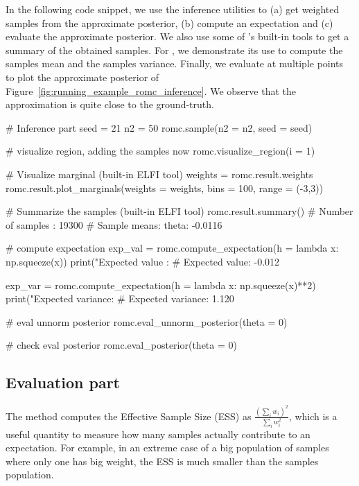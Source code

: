 \documentclass[article]{jss}
\begin{document}
In the following code snippet, we use the inference utilities to (a)
get weighted samples from the approximate posterior, (b) compute an
expectation and (c) evaluate the approximate posterior. We also use
some of 's built-in tools to get a summary of the obtained
samples. For , we demonstrate its use
to compute the samples mean and the samples variance. Finally, we
evaluate  at multiple points to plot the
approximate posterior of
Figure~\ref{fig:running_example_romc_inference}. We observe that the
approximation is quite close to the ground-truth.

\begin{Code}
# Inference part
seed = 21
n2 = 50
romc.sample(n2 = n2, seed = seed)

# visualize region, adding the samples now
romc.visualize_region(i = 1)

# Visualize marginal (built-in ELFI tool)
weights = romc.result.weights
romc.result.plot_marginals(weights = weights, bins = 100, range = (-3,3))

# Summarize the samples (built-in ELFI tool)
romc.result.summary()
# Number of samples  : 19300
# Sample means: theta: -0.0116

# compute expectation
exp_val = romc.compute_expectation(h = lambda x: np.squeeze(x))
print("Expected value   : %
# Expected value: -0.012

exp_var = romc.compute_expectation(h = lambda x: np.squeeze(x)**2)
print("Expected variance: %
# Expected variance: 1.120

# eval unnorm posterior
romc.eval_unnorm_posterior(theta = 0)

# check eval posterior
romc.eval_posterior(theta = 0)
\end{Code}



\subsection{Evaluation part}
\label{subsec:evaluation}

The method  computes the Effective Sample
Size (ESS) as \(\frac{(\sum_i w_i)^2}{\sum_i w_i^2}\), which is a
useful quantity to measure how many samples actually contribute to an
expectation. For example, in an extreme case of a big population of
samples where only one has big weight, the ESS is much smaller than
the samples population.
\end{document}
